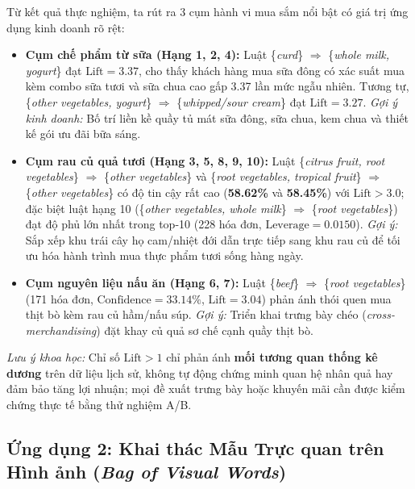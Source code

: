 \documentclass[conference]{IEEEtran}
\begin{document}
Từ kết quả thực nghiệm, ta rút ra 3 cụm hành vi mua sắm nổi bật có giá trị ứng dụng kinh doanh rõ rệt:
\begin{itemize}
    \item \textbf{Cụm chế phẩm từ sữa (Hạng 1, 2, 4):} Luật \{\textit{curd}\} $\Rightarrow$ \{\textit{whole milk, yogurt}\} đạt $\text{Lift} = 3.37$, cho thấy khách hàng mua sữa đông có xác suất mua kèm combo sữa tươi và sữa chua cao gấp 3.37 lần mức ngẫu nhiên. Tương tự, \{\textit{other vegetables, yogurt}\} $\Rightarrow$ \{\textit{whipped/sour cream}\} đạt $\text{Lift} = 3.27$. \textit{Gợi ý kinh doanh:} Bố trí liền kề quầy tủ mát sữa đông, sữa chua, kem chua và thiết kế gói ưu đãi bữa sáng.
    \item \textbf{Cụm rau củ quả tươi (Hạng 3, 5, 8, 9, 10):} Luật \{\textit{citrus fruit, root vegetables}\} $\Rightarrow$ \{\textit{other vegetables}\} và \{\textit{root vegetables, tropical fruit}\} $\Rightarrow$ \{\textit{other vegetables}\} có độ tin cậy rất cao (\textbf{58.62\%} và \textbf{58.45\%}) với $\text{Lift} > 3.0$; đặc biệt luật hạng 10 (\{\textit{other vegetables, whole milk}\} $\Rightarrow$ \{\textit{root vegetables}\}) đạt độ phủ lớn nhất trong top-10 (228 hóa đơn, $\text{Leverage} = 0.0150$). \textit{Gợi ý:} Sắp xếp khu trái cây họ cam/nhiệt đới dẫn trực tiếp sang khu rau củ để tối ưu hóa hành trình mua thực phẩm tươi sống hàng ngày.
    \item \textbf{Cụm nguyên liệu nấu ăn (Hạng 6, 7):} Luật \{\textit{beef}\} $\Rightarrow$ \{\textit{root vegetables}\} (171 hóa đơn, $\text{Confidence} = 33.14\%$, $\text{Lift} = 3.04$) phản ánh thói quen mua thịt bò kèm rau củ hầm/nấu súp. \textit{Gợi ý:} Triển khai trưng bày chéo (\textit{cross-merchandising}) đặt khay củ quả sơ chế cạnh quầy thịt bò.
\end{itemize}
\textit{Lưu ý khoa học:} Chỉ số $\text{Lift} > 1$ chỉ phản ánh \textbf{mối tương quan thống kê dương} trên dữ liệu lịch sử, không tự động chứng minh quan hệ nhân quả hay đảm bảo tăng lợi nhuận; mọi đề xuất trưng bày hoặc khuyến mãi cần được kiểm chứng thực tế bằng thử nghiệm A/B.

\subsection{Ứng dụng 2: Khai thác Mẫu Trực quan trên Hình ảnh (\textit{Bag of Visual Words})}
\end{document}
